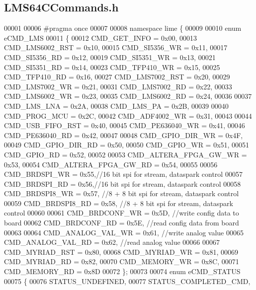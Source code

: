 \subsection{L\+M\+S64\+C\+Commands.\+h}
\label{LMS64CCommands_8h_source}

\begin{DoxyCode}
00001 
00006 \textcolor{preprocessor}{#pragma once}
00007 
00008 \textcolor{keyword}{namespace }lime \{
00009 
00010 \textcolor{keyword}{enum} eCMD_LMS
00011 \{
00012     CMD_GET_INFO = 0x00,
00013     CMD_LMS6002_RST = 0x10,
00015     CMD_SI5356_WR = 0x11,
00017     CMD_SI5356_RD = 0x12,
00019     CMD_SI5351_WR = 0x13,
00021     CMD_SI5351_RD = 0x14,
00023     CMD_TFP410_WR = 0x15,
00025     CMD_TFP410_RD = 0x16,
00027     CMD_LMS7002_RST = 0x20,
00029     CMD_LMS7002_WR = 0x21,
00031     CMD_LMS7002_RD = 0x22,
00033     CMD_LMS6002_WR = 0x23,
00035     CMD_LMS6002_RD = 0x24,
00036 
00037     CMD_LMS_LNA = 0x2A,
00038     CMD_LMS_PA = 0x2B,
00039 
00040     CMD_PROG_MCU = 0x2C,
00042     CMD_ADF4002_WR = 0x31,
00043 
00044     CMD_USB_FIFO_RST = 0x40,
00045     CMD_PE636040_WR = 0x41,
00046     CMD_PE636040_RD = 0x42,
00047 
00048     CMD_GPIO_DIR_WR = 0x4F,
00049     CMD_GPIO_DIR_RD = 0x50,
00050     CMD_GPIO_WR = 0x51,
00051     CMD_GPIO_RD = 0x52,
00052 
00053     CMD_ALTERA_FPGA_GW_WR = 0x53,
00054     CMD_ALTERA_FPGA_GW_RD = 0x54,
00055 
00056     CMD_BRDSPI_WR = 0x55,\textcolor{comment}{//16 bit spi for stream, dataspark control}
00057     CMD_BRDSPI_RD = 0x56,\textcolor{comment}{//16 bit spi for stream, dataspark control}
00058     CMD_BRDSPI8_WR = 0x57, \textcolor{comment}{//8 + 8 bit spi for stream, dataspark control}
00059     CMD_BRDSPI8_RD = 0x58, \textcolor{comment}{//8 + 8 bit spi for stream, dataspark control}
00060 
00061     CMD_BRDCONF_WR = 0x5D, \textcolor{comment}{//write config data to board}
00062     CMD_BRDCONF_RD = 0x5E, \textcolor{comment}{//read config data from board}
00063 
00064     CMD_ANALOG_VAL_WR = 0x61, \textcolor{comment}{//write analog value}
00065     CMD_ANALOG_VAL_RD = 0x62, \textcolor{comment}{//read analog value}
00066 
00067     CMD_MYRIAD_RST = 0x80,
00068     CMD_MYRIAD_WR = 0x81,
00069     CMD_MYRIAD_RD = 0x82,
00070     CMD_MEMORY_WR = 0x8C,
00071     CMD_MEMORY_RD = 0x8D
00072 \};
00073 
00074 \textcolor{keyword}{enum} eCMD_STATUS
00075 \{
00076     STATUS_UNDEFINED,
00077     STATUS_COMPLETED_CMD,

\end{DoxyCode}
